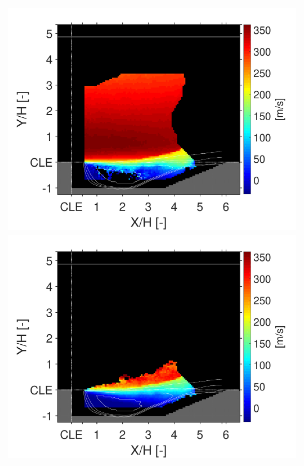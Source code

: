 \begin{figure}
\centering
        {\includegraphics[width=3in,trim=0.35in 0 0.42in 0, clip]{figures/B1/cond_statistics/B1_Ux_AVG_reactants}} \hspace{0.4cm}
        {\includegraphics[width=3in,trim=0.35in 0 0.42in 0, clip]{figures/B1/cond_statistics/B1_Ux_AVG_products}}
        \newline
        

\end{figure}
